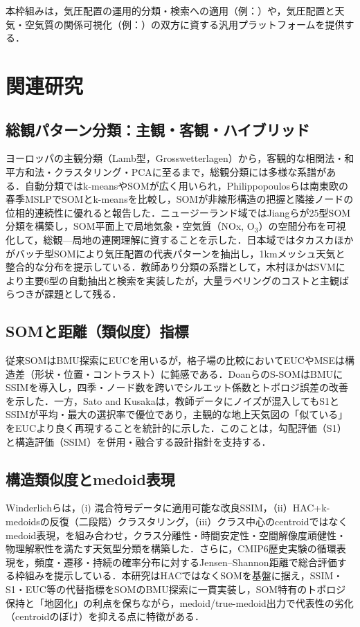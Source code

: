 \documentclass{jarticle}
\theoremstyle{definition}
\begin{document}
本枠組みは，気圧配置の運用的分類・検索への適用（例：\cite{木村広希2009サポートベクターマシンを用いた気圧配置検出手法の提案}）や，気圧配置と天気・空気質の関係可視化（例：\cite{jiang2013classification}）の双方に資する汎用プラットフォームを提供する．
\section{関連研究}
\subsection{総観パターン分類：主観・客観・ハイブリッド}
ヨーロッパの主観分類（Lamb型，Grosswetterlagen）から，客観的な相関法・和平方和法・クラスタリング・PCAに至るまで，総観分類には多様な系譜がある．自動分類ではk-meansやSOMが広く用いられ，Philippopoulosら\cite{philippopoulos2014performance}は南東欧の春季MSLPでSOMとk-meansを比較し，SOMが非線形構造の把握と隣接ノードの位相的連続性に優れると報告した．ニュージーランド域ではJiangら\cite{jiang2013classification}が25型SOM分類を構築し，SOM平面上で局地気象・空気質（NOx, O$_3$）の空間分布を可視化して，総観—局地の連関理解に資することを示した．日本域ではタカスカほか\cite{takasuka2024}がバッチ型SOMにより気圧配置の代表パターンを抽出し，1kmメッシュ天気と整合的な分布を提示している．教師あり分類の系譜として，木村ほか\cite{木村広希2009サポートベクターマシンを用いた気圧配置検出手法の提案}はSVMにより主要6型の自動抽出と検索を実装したが，大量ラベリングのコストと主観ばらつきが課題として残る．
\subsection{SOMと距離（類似度）指標}
従来SOMはBMU探索にEUCを用いるが，格子場の比較においてEUCやMSEは構造差（形状・位置・コントラスト）に鈍感である\cite{doan2021s}．DoanらのS-SOM\cite{doan2021s}はBMUにSSIMを導入し，四季・ノード数を跨いでシルエット係数とトポロジ誤差の改善を示した．一方，Sato and Kusaka\cite{SATOTakuto20212021-047}は，教師データにノイズが混入してもS1とSSIMが平均・最大の選択率で優位であり，主観的な地上天気図の「似ている」をEUCより良く再現することを統計的に示した．このことは，勾配評価（S1）と構造評価（SSIM）を併用・融合する設計指針を支持する．
\subsection{構造類似度とmedoid表現}
Winderlichら\cite{winderlich2024classification}は，(i) 混合符号データに適用可能な改良SSIM，（ii）HAC+k-medoidsの反復（二段階）クラスタリング，（iii）クラス中心のcentroidではなくmedoid表現，を組み合わせ，クラス分離性・時間安定性・空間解像度頑健性・物理解釈性を満たす天気型分類を構築した．さらに，CMIP6歴史実験の循環表現を，頻度・遷移・持続の確率分布に対するJensen–Shannon距離で総合評価する枠組みを提示している．本研究はHACではなくSOMを基盤に据え，SSIM・S1・EUC等の代替指標をSOMのBMU探索に一貫実装し，SOM特有のトポロジ保持と「地図化」の利点を保ちながら，medoid/true-medoid出力で代表性の劣化（centroidのぼけ）を抑える点に特徴がある．
\end{document}
